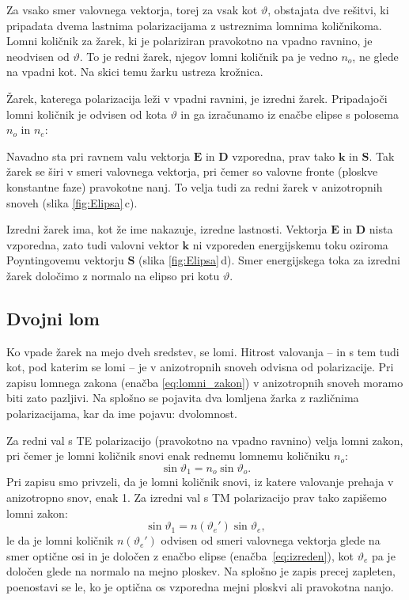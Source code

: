 Za vsako smer valovnega vektorja, torej za vsak kot $\vartheta$, obstajata dve rešitvi, 
ki pripadata dvema lastnima polarizacijama z ustreznima lomnima količnikoma. 
Lomni količnik za žarek, ki je polariziran pravokotno na vpadno ravnino, 
je neodvisen od $\vartheta$. To je redni žarek, njegov lomni količnik 
pa je vedno $n_o$, ne glede na vpadni kot. Na skici temu žarku ustreza krožnica.

Žarek, katerega polarizacija leži v vpadni ravnini, je izredni žarek. Pripadajoči
lomni količnik je odvisen od kota $\vartheta$ in 
ga izračunamo iz enačbe elipse s polosema $n_o$ in $n_e$:

Navadno sta pri ravnem valu vektorja $\mathbf{E}$ in $\mathbf{D}$ vzporedna, 
prav tako $\mathbf{k}$ in $\mathbf{S}$. Tak žarek se širi v smeri
valovnega vektorja, pri čemer
so valovne fronte (ploskve konstantne faze) pravokotne nanj. 
To velja tudi za redni žarek v anizotropnih snoveh (slika \ref{fig:Elipsa}\,c). 

Izredni žarek ima, kot že ime nakazuje, izredne lastnosti. Vektorja
$\mathbf{E}$ in $\mathbf{D}$ nista vzporedna, zato tudi valovni vektor $\mathbf{k}$ ni vzporeden
energijskemu toku oziroma Poyntingovemu vektorju $\mathbf{S}$ 
(slika \ref{fig:Elipsa}\,d). 
Smer energijskega toka za izredni žarek določimo z normalo 
na elipso pri kotu $\vartheta$. 

\subsection*{Dvojni lom}
Ko vpade žarek na mejo dveh sredstev, se lomi. Hitrost valovanja -- in s tem tudi 
kot, pod katerim se lomi -- je v anizotropnih snoveh odvisna od polarizacije.
Pri zapisu lomnega zakona (enačba \ref{eq:lomni_zakon}) 
v anizotropnih snoveh moramo biti zato pazljivi. Na splošno
se pojavita dva lomljena žarka z različnima polarizacijama, kar
da ime pojavu: dvolomnost. 

Za redni val s TE polarizacijo (pravokotno na vpadno ravnino) velja lomni zakon, pri čemer
je lomni količnik snovi enak rednemu lomnemu količniku $n_o$:
\begin{equation}
\sin\vartheta_{1}=n_{o}\sin\vartheta_{o}.
\end{equation}
Pri zapisu smo privzeli, da je lomni količnik snovi, iz katere valovanje prehaja v anizotropno snov, 
enak 1. Za izredni val s TM polarizacijo 
prav tako zapišemo lomni zakon:
\begin{equation}
\sin\vartheta_{1}=n(\vartheta_e')\sin\vartheta_{e},
\end{equation}
le da je lomni količnik $n(\vartheta_e')$ odvisen od smeri valovnega vektorja glede na smer optične osi
in je določen z enačbo elipse (enačba~\ref{eq:izreden}), kot $\vartheta_e$ pa je določen glede na
normalo na mejno ploskev. Na splošno je zapis precej zapleten, poenostavi se le, 
ko je optična os vzporedna mejni ploskvi ali pravokotna nanjo. 

